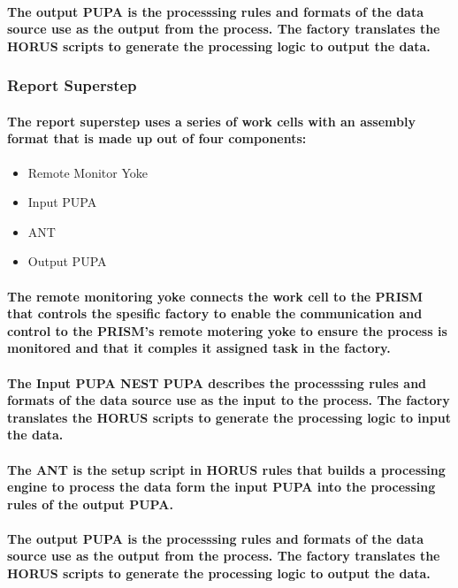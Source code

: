 \documentclass{acm_proc_article-sp}
\begin{document}
\paragraph{The output PUPA is the processsing rules and formats of the data source use as the output from the process. The factory translates the HORUS scripts to generate the processing logic to output the data.}
\subsubsection{Report Superstep}
\paragraph{The report superstep uses a series of work cells with an assembly format that is made up out of four components:}
\begin{itemize}
\item{Remote Monitor Yoke}
\item{Input PUPA}
\item{ANT}
\item{Output PUPA}
\end{itemize}
\paragraph{The remote monitoring yoke connects the work cell to the PRISM that controls the spesific factory to enable the communication and control to the PRISM's remote motering yoke to ensure the process is monitored and that it comples it assigned task in the factory.}
\paragraph{The Input PUPA NEST PUPA describes the processsing rules and formats of the data source use as the input to the process. The factory translates the HORUS scripts to generate the processing logic to input the data.}
\paragraph{The ANT is the setup script in HORUS rules that builds a processing engine to process the data form the input PUPA into the processing rules of the output PUPA. }
\paragraph{The output PUPA is the processsing rules and formats of the data source use as the output from the process. The factory translates the HORUS scripts to generate the processing logic to output the data.}
\pagebreak
\end{document}
